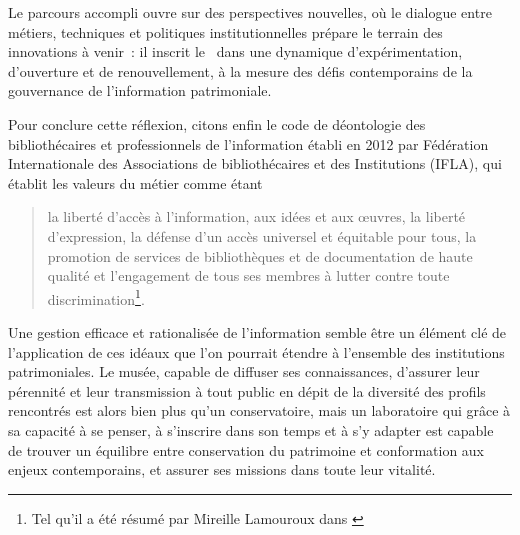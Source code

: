 Le parcours accompli ouvre sur des perspectives nouvelles, où le dialogue entre métiers, techniques et politiques institutionnelles prépare le terrain des innovations à venir~: il inscrit le \mae~dans une dynamique d’expérimentation, d’ouverture et de renouvellement, à la mesure des défis contemporains de la gouvernance de l’information patrimoniale.



\bigskip



Pour conclure cette réflexion, citons enfin le code de déontologie des bibliothécaires et professionnels de l'information établi en 2012 par Fédération Internationale des Associations de bibliothécaires et des Institutions (IFLA), qui établit les valeurs du métier comme étant 

\begin{quote}
	
	\og la liberté d’accès à l’information, aux idées et aux œuvres, la liberté d’expression, la défense d’un accès universel et équitable pour tous, la promotion de services de bibliothèques et de documentation de haute qualité et l’engagement de tous ses membres à lutter contre toute discrimination\footnote{Tel qu'il a été résumé par Mireille Lamouroux dans \cite[p. 4]{GouvernanceLinformationPerspectives2013}}.\fg

\end{quote}

Une gestion efficace et rationalisée de l'information semble être un élément clé de l'application de ces idéaux que l'on pourrait étendre à l'ensemble des institutions patrimoniales. Le musée, capable de diffuser ses connaissances, d'assurer leur pérennité et leur transmission à tout public en dépit de la diversité des profils rencontrés est alors bien plus qu’un conservatoire, mais un laboratoire qui grâce à sa capacité à se penser, à s’inscrire dans son temps et à s'y adapter est capable de trouver un équilibre entre conservation du patrimoine et conformation aux enjeux contemporains, et assurer ses missions dans toute leur vitalité.